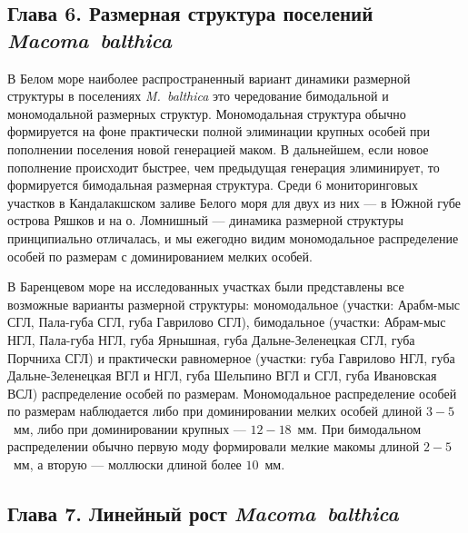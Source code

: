 {{\subsection*{Глава 6. Размерная структура поселений \textit{Macoma~balthica}}
В Белом море наиболее распространенный вариант динамики размерной структуры в поселениях {\it M.~balthica} это чередование бимодальной и мономодальной размерных структур.
Мономодальная структура обычно формируется на фоне практически полной элиминации крупных особей при пополнении поселения новой генерацией маком.
В дальнейшем, если новое пополнение происходит быстрее, чем предыдущая генерация элиминирует, то формируется бимодальная размерная структура.
Среди 6 мониторинговых участков в Кандалакшском заливе Белого моря для двух из них --- в Южной губе острова Ряшков и на о. Ломнишный --- динамика размерной структуры принципиально отличалась, и мы ежегодно видим мономодальное распределение особей по размерам с доминированием мелких особей.

В Баренцевом море на исследованных участках были представлены все возможные варианты размерной структуры: мономодальное (участки: Арабм-мыс СГЛ, Пала-губа СГЛ, губа Гаврилово СГЛ), бимодальное (участки: Абрам-мыс НГЛ, Пала-губа НГЛ, губа Ярнышная, губа Дальне-Зеленецкая СГЛ, губа Порчниха СГЛ) и практически равномерное (участки: губа Гаврилово НГЛ, губа Дальне-Зеленецкая ВГЛ и НГЛ, губа Шельпино ВГЛ и СГЛ, губа Ивановская ВСЛ) распределение особей по размерам. 
Мономодальное распределение особей по размерам наблюдается либо при доминировании мелких особей длиной $3-5$~мм, либо при доминировании крупных --- $12-18$~мм.
При бимодальном распределении обычно первую моду формировали мелкие макомы длиной $2-5$~мм, а вторую --- моллюски длиной более $10$~мм.

\subsection*{Глава 7. Линейный рост \textit{Macoma~balthica}}

}}
